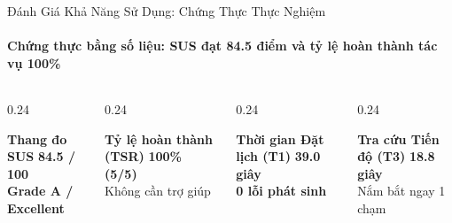 \begin{frame}{Đánh Giá Khả Năng Sử Dụng: Chứng Thực Thực Nghiệm}
  \framesubtitle{\color{PetcareSecondary}\textbf{Chứng thực bằng số liệu: SUS đạt 84.5 điểm và tỷ lệ hoàn thành tác vụ 100\%}}

  \begin{columns}[c]
    \begin{column}{0.24\textwidth}
      \begin{block}{\centering \tiny \textbf{Thang đo SUS}}
        \centering \vspace{0.5mm}
        {\large \textbf{\color{PetcareSuccess}84.5 / 100}}\\[0.5mm]
        {\tiny \textbf{Grade A / Excellent}}
      \end{block}
    \end{column}
    \begin{column}{0.24\textwidth}
      \begin{block}{\centering \tiny \textbf{Tỷ lệ hoàn thành (TSR)}}
        \centering \vspace{0.5mm}
        {\large \textbf{\color{PetcareSuccess}100\% (5/5)}}\\[0.5mm]
        {\tiny Không cần trợ giúp}
      \end{block}
    \end{column}
    \begin{column}{0.24\textwidth}
      \begin{block}{\centering \tiny \textbf{Thời gian Đặt lịch (T1)}}
        \centering \vspace{0.5mm}
        {\large \textbf{\color{PetcarePrimary}39.0 giây}}\\[0.5mm]
        {\tiny \textbf{0 lỗi phát sinh}}
      \end{block}
    \end{column}
    \begin{column}{0.24\textwidth}
      \begin{block}{\centering \tiny \textbf{Tra cứu Tiến độ (T3)}}
        \centering \vspace{0.5mm}
        {\large \textbf{\color{PetcarePrimary}18.8 giây}}\\[0.5mm]
        {\tiny Nắm bắt ngay 1 chạm}
      \end{block}
    \end{column}
  \end{columns}


\end{frame}
